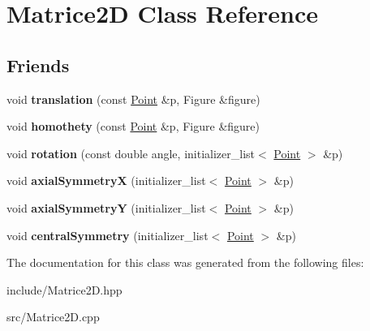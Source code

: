 \hypertarget{class_matrice2_d}{}\section{Matrice2D Class Reference}
\label{class_matrice2_d}
\subsection*{Friends}
\begin{DoxyCompactItemize}
\item 
void {\bfseries translation} (const \hyperlink{class_point}{Point} \&p, Figure \&figure)\hypertarget{class_matrice2_d_a4384bd2f5dcd6120136ea610c770feed}{}\label{class_matrice2_d_a4384bd2f5dcd6120136ea610c770feed}

\item 
void {\bfseries homothety} (const \hyperlink{class_point}{Point} \&p, Figure \&figure)\hypertarget{class_matrice2_d_abc140d30a77cbba53aec8fa763f4e303}{}\label{class_matrice2_d_abc140d30a77cbba53aec8fa763f4e303}

\item 
void {\bfseries rotation} (const double angle, initializer\+\_\+list$<$ \hyperlink{class_point}{Point} $>$ \&p)\hypertarget{class_matrice2_d_ae7cf79117e4afdc89342479115362113}{}\label{class_matrice2_d_ae7cf79117e4afdc89342479115362113}

\item 
void {\bfseries axial\+SymmetryX} (initializer\+\_\+list$<$ \hyperlink{class_point}{Point} $>$ \&p)\hypertarget{class_matrice2_d_a3e79dbd15ee80d3349565c0cd6ac4142}{}\label{class_matrice2_d_a3e79dbd15ee80d3349565c0cd6ac4142}

\item 
void {\bfseries axial\+SymmetryY} (initializer\+\_\+list$<$ \hyperlink{class_point}{Point} $>$ \&p)\hypertarget{class_matrice2_d_ad7251cd751be521a61467913a841f29f}{}\label{class_matrice2_d_ad7251cd751be521a61467913a841f29f}

\item 
void {\bfseries central\+Symmetry} (initializer\+\_\+list$<$ \hyperlink{class_point}{Point} $>$ \&p)\hypertarget{class_matrice2_d_ae6b975104b9c27e7a7586fa1515ac2d0}{}\label{class_matrice2_d_ae6b975104b9c27e7a7586fa1515ac2d0}

\end{DoxyCompactItemize}


The documentation for this class was generated from the following files\+:\begin{DoxyCompactItemize}
\item 
include/Matrice2\+D.\+hpp\item 
src/Matrice2\+D.\+cpp\end{DoxyCompactItemize}
